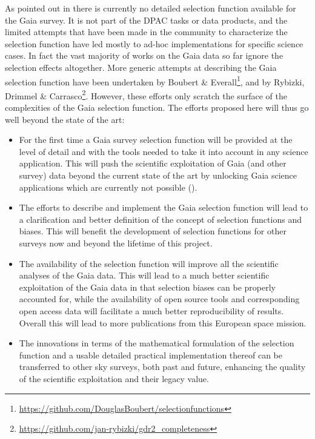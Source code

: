 As pointed out in  there is currently no detailed selection function available for the Gaia survey. It is not part of the DPAC tasks or data products, and the limited attempts that have been made in the community to characterize the selection function have led mostly to ad-hoc implementations for specific science cases. In fact the vast majority of works on the Gaia data so far ignore the selection effects altogether. More generic attempts at describing the Gaia selection function have been undertaken by Boubert \& Everall\footnote{\url{https://github.com/DouglasBoubert/selectionfunctions}}, and by Rybizki, Drimmel \& Carrasco\footnote{\url{https://github.com/jan-rybizki/gdr2_completeness}}. However, these efforts only scratch the surface of the complexities of the Gaia selection function. The efforts proposed here will thus go well beyond the state of the art:
\begin{itemize}
    \item For the first time a Gaia survey selection function will be provided at the level of detail and with the tools needed to take it into account in any science application. This will push the scientific exploitation of Gaia (and other survey) data beyond the current state of the art by unlocking Gaia science applications which are currently not possible ().
    \item The efforts to describe and implement the Gaia selection function will lead to a clarification and better definition of the concept of selection functions and biases. This will benefit the development of selection functions for other surveys now and beyond the lifetime of this project.
    \item The availability of the selection function will improve all the scientific analyses of the Gaia data. This will lead to a much better scientific exploitation of the Gaia data in that selection biases can be properly accounted for, while the availability of open source tools and corresponding open access data will facilitate a much better reproducibility of results. Overall this will lead to more publications from this European space mission.
    \item The innovations in terms of the mathematical formulation of the selection function and a usable detailed practical implementation thereof can be transferred to other sky surveys, both past and future, enhancing the quality of the scientific exploitation and their legacy value.
\end{itemize}

